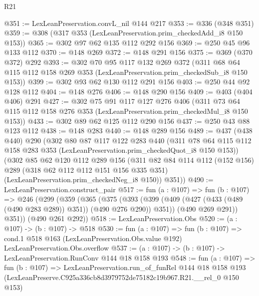 \begin{lexlean}{R21}
\begin{coremodule}
@351 := LexLeanPreservation.convL_nil @144 @217
@353 := @336 (@348 @351)
@359 := @308 (@317 @353 (LexLeanPreservation.prim_checkedAdd_i8 @150 @153))
@365 := @302 @97 @62 @135 @112 @292 @156
@369 := @250 @45 @96 @133 @112
@370 := @148 @269
@372 := @148 @291 @156
@375 := @369 (@370 @372) @292
@393 := @302
    @70
    @95
    @117
    @132
    @269
    @372
    (@311 @68 @64 @115 @112 @158 @269 @353 (LexLeanPreservation.prim_checkedSub_i8 @150 @153))
@399 := @302 @93 @62 @130 @112 @291 @156
@403 := @250 @44 @92 @128 @112
@404 := @148 @276
@406 := @148 @290 @156
@409 := @403 (@404 @406) @291
@427 := @302
    @75
    @91
    @117
    @127
    @276
    @406
    (@311 @73 @64 @115 @112 @158 @276 @353 (LexLeanPreservation.prim_checkedMul_i8 @150 @153))
@433 := @302 @89 @62 @125 @112 @290 @156
@437 := @250 @43 @88 @123 @112
@438 := @148 @283
@440 := @148 @289 @156
@489 := @437
    (@438 @440)
    @290
    (@302
      @80
      @87
      @117
      @122
      @283
      @440
      (@311 @78 @64 @115 @112 @158 @283 @353 (LexLeanPreservation.prim_checkedQuot_i8 @150 @153))
      (@302
        @85
        @62
        @120
        @112
        @289
        @156
        (@311
          @82
          @84
          @114
          @112
          (@152 @156)
          @289
          (@318 @62 @112 @112 @151 @156 @335 @351)
          (LexLeanPreservation.prim_checkedNeg_i8 @150))
        @351))
@490 := LexLeanPreservation.construct_pair
@517 := fun (a : @107) =>
  fun (b : @107) =>
  @246
    (@299
      (@359
        (@365
          (@375
            (@393 (@399 (@409 (@427 (@433 (@489 (@490 @283 @289)) @351)) (@490 @276 @290)) @351))
            (@490 @269 @291))
          @351))
      (@490 @261 @292))
@518 := LexLeanPreservation.Obs
@520 := (a : @107) -> (b : @107) -> @518
@530 := fun (a : @107) =>
  fun (b : @107) =>
  cond.{1} @518 @163 (LexLeanPreservation.Obs.value @192) LexLeanPreservation.Obs.overflow
@537 := (a : @107) -> (b : @107) -> LexLeanPreservation.RunConv @144 @18 @158 @193
@548 := fun (a : @107) =>
  fun (b : @107) =>
  LexLeanPreservation.run_of_funRel
    @144
    @18
    @158
    @193
    (LexLeanPreserve.C925a336cb8d3979752de75182c19b967.R21.__rel_0 @150 @153)
\end{coremodule}
\end{lexlean}
